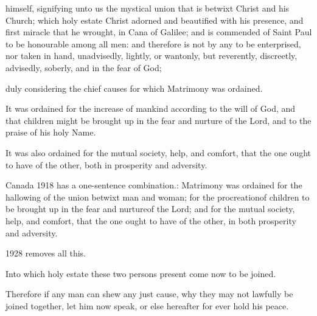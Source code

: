 himself, %
signifying unto us the mystical union that is betwixt Christ and his Church; which holy estate Christ adorned and beautified with his presence, and first miracle that he wrought, in Cana of Galilee; and is commended of Saint Paul to be honourable among all men: and therefore is not by any to be enterprised, nor taken in hand, unadvisedly, lightly, or wantonly,
but reverently, discreetly, advisedly, soberly, and in the fear of God;
\begin{leftbar}
duly considering the 
chief %
causes for which Matrimony was ordained.

It was ordained for the 
increase of mankind according to the will of God, and that children might %
be brought up in the fear and nurture of the Lord, and to the praise of his holy Name.


It was 
also %
ordained for the mutual society, help, and comfort, that the one ought to have of the other, both in prosperity and adversity.

Canada 1918 has a one-sentence combination.:
Matrimony was ordained for the hallowing of the union betwixt man and woman; for the procreationof children to be brought up in the fear and nurtureof the Lord; and for the mutual society, help, and comfort, that the one ought to have of the other, in
both prosperity and adversity. 

1928 removes all this.
\end{leftbar}

Into which holy estate these two persons present come now to be joined.

Therefore if any man can shew any just cause, why they may not lawfully be joined together, let him now speak, or else hereafter for ever hold his peace.

\smallskip
{}


